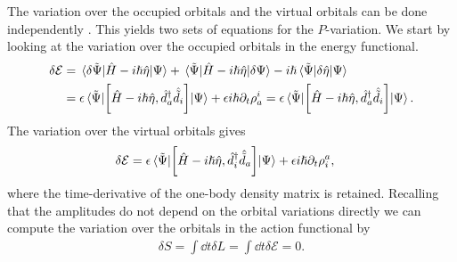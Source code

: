             The variation over the occupied orbitals and the virtual orbitals
            can be done independently \cite{kvaal2012ab}.
            This yields two sets of equations for the $P$-variation.
            We start by looking at the variation over the occupied orbitals in
            the energy functional.
            \begin{align}
                \delta\mathcal{E}
                &=
                \mel*{\delta\tilde{\Psi}}{\hat{H} - i\hslash\hat{\eta}}{\Psi}
                +
                \mel*{\tilde{\Psi}}{\hat{H} - i\hslash\hat{\eta}}{\delta\Psi}
                -i\hslash
                \mel*{\tilde{\Psi}}{\delta\hat{\eta}}{\Psi}
                \\
                &=
                \epsilon
                \mel*{\tilde{\Psi}}{
                    \left[
                        \hat{H} - i\hslash\hat{\eta}
                    , 
                        \hat{d}^{\dagger}_{a}\hat{\tilde{d}}_{i}
                    \right]
                }{\Psi}
                + \epsilon i\hslash\partial_t\rho^{i}_{a}
                =
                \epsilon
                \mel*{\tilde{\Psi}}{
                    \left[
                        \hat{H} - i\hslash\hat{\eta}
                    , 
                        \hat{d}^{\dagger}_{a}\hat{\tilde{d}}_{i}
                    \right]
                }{\Psi}.
                \label{eq:occupied-variation}
            \end{align}
            The variation over the virtual orbitals gives
            \begin{align}
                \delta\mathcal{E}
                &=
                \epsilon
                \mel*{\tilde{\Psi}}{
                    \left[
                        \hat{H} - i\hslash\hat{\eta}
                    , 
                        \hat{d}^{\dagger}_{i}\hat{\tilde{d}}_{a}
                    \right]
                }{\Psi}
                + \epsilon i\hslash\partial_t\rho^{a}_{i},
                \label{eq:virtual-variation}
            \end{align}
            where the time-derivative of the one-body density matrix is
            retained.
            Recalling that the amplitudes do not depend on the orbital
            variations directly we can compute the variation over the orbitals
            in the action functional by
            \begin{align}
                \delta S
                = \int \dd t \delta L
                = \int \dd t \delta\mathcal{E}
                = 0.
            \end{align}
